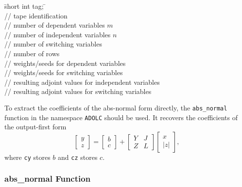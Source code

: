 \begin{tabbing}
\hspace{0.5in}\={\sf short int tag;} \hspace{1.1in}\= \kill    %
\\
         \> // tape identification \\
                 \> // number of dependent variables $m$\\
                 \> // number of independent variables $n$\\
                 \> // number of switching variables\\
                 \> // number of rows\\
      \> // weights/seeds for dependent variables \\
\> // weights/seeds for switching variables \\
       \> // resulting adjoint values for independent variables\\
 \> // resulting adjoint values for switching variables \\
\end{tabbing}

To extract the coefficients of the abs-normal form directly, the \texttt{abs\_normal} function in the namespace \texttt{ADOLC} should be used. It recovers the
coefficients of the output-first form
\[
  \left[\begin{array}{c}
    y\\ z
  \end{array}\right]
  =
  \left[\begin{array}{c}
    b\\ c
  \end{array}\right]
  +
  \left[\begin{array}{cc}
    Y & J\\ Z & L
  \end{array}\right]
  \left[\begin{array}{c}
    x\\ |z|
  \end{array}\right],
\]
where \texttt{cy} stores $b$ and \texttt{cz} stores $c$.

\subsubsection{abs\_normal Function}

